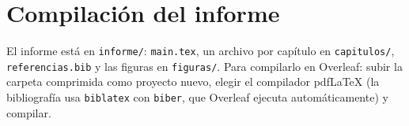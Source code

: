 \section{Compilación del informe}

El informe está en \texttt{informe/}: \texttt{main.tex}, un archivo por capítulo en \texttt{capitulos/},
\texttt{referencias.bib} y las figuras en \texttt{figuras/}. Para compilarlo en Overleaf: subir la carpeta comprimida
como proyecto nuevo, elegir el compilador pdf\LaTeX{} (la bibliografía usa \texttt{biblatex} con \texttt{biber}, que
Overleaf ejecuta automáticamente) y compilar.
